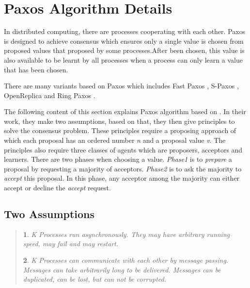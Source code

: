 \documentclass[12pt, a4paper]{article}
\makeatletter
\newtheorem*{assumption*}{\assumptionnumber}
\providecommand{\assumptionnumber}{}
\newenvironment{assumption}[2]
 {
  \renewcommand{\assumptionnumber}{Assumption #1}
  \begin{assumption*}K
  \protected@edef\@currentlabel{#1}
 }
 {
  \end{assumption*}
 }
\makeatother
\begin{document}

\section{Paxos Algorithm Details} \label{sec:paxos}

In distributed computing, there are processes cooperating with each other. Paxos is designed to achieve consensus which ensures only a single value is chosen from proposed values that proposed by some processes\cite{fischer1983consensus}.After been chosen, this value is also available to be learnt by all processes when a process can only learn a value that has been chosen.

There are many variants based on Paxos \cite{lamport2001paxos} which includes Fast Paxos \cite{fastpaxos}, S-Paxos \cite{spaxos},  OpenReplica \cite{openreplica} and Ring Paxos \cite{ringpaxos}.

The following content of this section explains Paxos algorithm based on \cite{fischer1983consensus}. In their work, they make two assumptions, based on that, they then give principles to solve the consensus problem. These principles require a proposing approach of which each proposal has an ordered number \textit{n} and a proposal value \textit{v}. The principles also require three classes of agents which are proposers, acceptors and learners. There are two phases when choosing a value. \textit{Phase1} is to \textit{prepare} a proposal by requesting a majority of acceptors. \textit{Phase2} is to ask the majority to \textit{accept} this proposal. In this phase, any acceptor among the majority can either accept or decline the \textit{accept} request.

\subsection{Two Assumptions}
\begin{quote}
  \begin{assumption}{1}{F}\label{as:1}
    Processes run asynchronously.
    They may have arbitrary running speed, may fail and may restart.
  \end{assumption}
  \begin{assumption}{2}{F}\label{as:2}
    Processes can communicate with each other by message passing.
    Messages can take arbitrarily long to be delivered.
    Messages can be duplicated, can be lost, but can not be corrupted.
  \end{assumption}
\end{quote}
\end{document}
